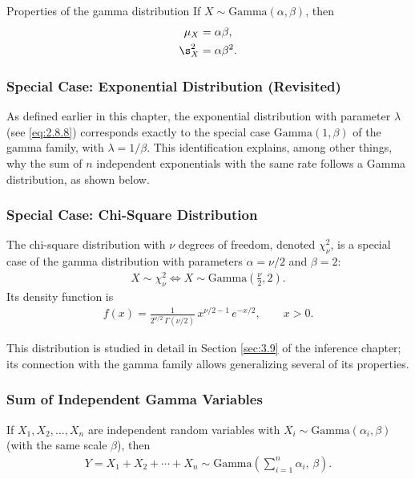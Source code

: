 {Properties of the gamma distribution} If $X \sim \text{Gamma}(\alpha, \beta)$, then
\begin{align}
 \mu_X &= \alpha\beta, \\
 \s_X^2 &= \alpha\beta^2.
\end{align}

\subsubsection{Special Case: Exponential Distribution (Revisited)}

As defined earlier in this chapter, the exponential distribution with parameter
$\lambda$ (see \eqref{eq:2.8.8}) corresponds exactly to the special case
$\text{Gamma}(1, \beta)$ of the gamma family, with $\lambda = 1/\beta$. This
identification explains, among other things, why the sum of $n$ independent
exponentials with the same rate follows a Gamma distribution, as shown below.

\subsubsection{Special Case: Chi-Square Distribution}

The chi-square distribution with $\nu$ degrees of freedom, denoted $\chi^2_\nu$, is a special case of the gamma distribution with parameters $\alpha = \nu/2$ and $\beta = 2$:
\begin{align}
 \label{eq:2.8.9}
 X \sim \chi^2_\nu \iff X \sim \text{Gamma}\!\left(\frac{\nu}{2}, 2\right).
\end{align}
Its density function is
\begin{align}
 f(x) = \frac{1}{2^{\nu/2}\,\Gamma(\nu/2)}\,x^{\nu/2-1}\,e^{-x/2}, \qquad x > 0.
\end{align}

This distribution is studied in detail in Section \ref{sec:3.9} of the inference chapter; its connection with the gamma family allows generalizing several of its properties.

\subsubsection{Sum of Independent Gamma Variables}

\begin{teorema}
If $X_1, X_2, \dots, X_n$ are independent random variables with $X_i \sim \text{Gamma}(\alpha_i, \beta)$ (with the same scale $\beta$), then
\begin{align}
 \label{eq:2.8.10}
 Y = X_1 + X_2 + \cdots + X_n \sim \text{Gamma}\!\left(\sum_{i=1}^n \alpha_i,\, \beta\right).
\end{align}
\end{teorema}

